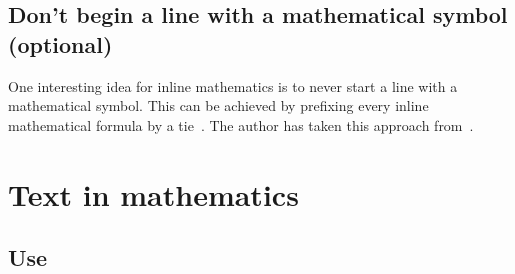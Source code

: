 \subsection{Don’t begin a line with a mathematical symbol (optional)}

One interesting idea for inline mathematics is to never start a line with a mathematical symbol.
This can be achieved by prefixing every inline mathematical formula by a tie~\inlinecode{\customtexttilde}.
The author has taken this approach from~\cite{nomath_at_line}.





\section{Text in mathematics}


\subsection{Use }

